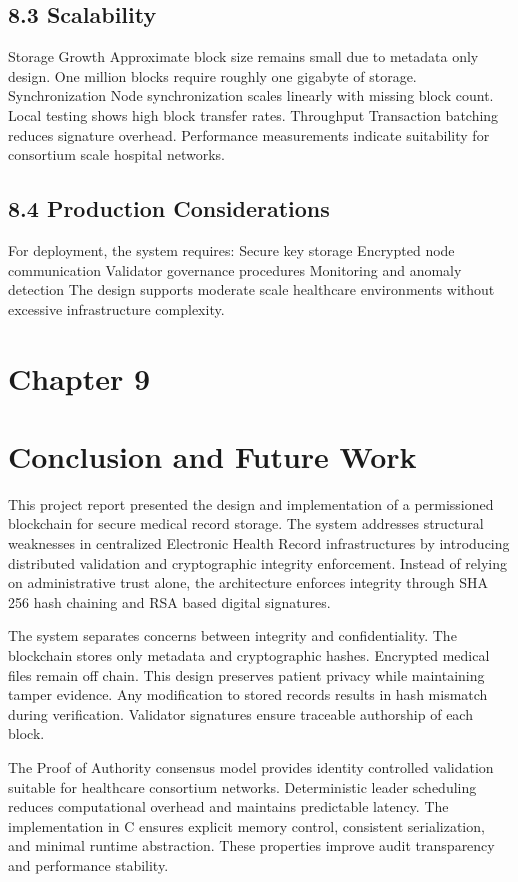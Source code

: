 \subsection*{8.3 Scalability}
Storage Growth
Approximate block size remains small due to metadata only design. One million blocks require roughly one gigabyte of storage.
Synchronization
Node synchronization scales linearly with missing block count. Local testing shows high block transfer rates.
Throughput
Transaction batching reduces signature overhead. Performance measurements indicate suitability for consortium scale hospital networks.

\subsection*{8.4 Production Considerations}
For deployment, the system requires:
Secure key storage
Encrypted node communication
Validator governance procedures
Monitoring and anomaly detection
The design supports moderate scale healthcare environments without excessive infrastructure complexity.

\newpage
\section*{Chapter 9}
\label{ch:9}

\section*{Conclusion and Future Work}

This project report presented the design and implementation of a permissioned blockchain for secure medical record storage. The system addresses structural weaknesses in centralized Electronic Health Record infrastructures by introducing distributed validation and cryptographic integrity enforcement. Instead of relying on administrative trust alone, the architecture enforces integrity through SHA 256 hash chaining and RSA based digital signatures.

The system separates concerns between integrity and confidentiality. The blockchain stores only metadata and cryptographic hashes. Encrypted medical files remain off chain. This design preserves patient privacy while maintaining tamper evidence. Any modification to stored records results in hash mismatch during verification. Validator signatures ensure traceable authorship of each block.

The Proof of Authority consensus model provides identity controlled validation suitable for healthcare consortium networks. Deterministic leader scheduling reduces computational overhead and maintains predictable latency. The implementation in C ensures explicit memory control, consistent serialization, and minimal runtime abstraction. These properties improve audit transparency and performance stability.

